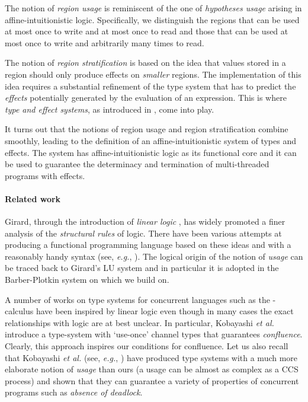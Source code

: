 \documentclass[11pt]{article}
\begin{document}
The notion of {\em region usage} is reminiscent 
of the one of {\em hypotheses usage} arising in affine-intuitionistic logic.
Specifically, we  distinguish the regions that can be used at most
once to write and at most once to read and those that can be used at
most once to write and arbitrarily many times to read. 

The notion of {\em region stratification} is based
on the idea that values stored in a region should only produce effects
on {\em smaller} regions.  The implementation of this idea requires a
substantial refinement of the type system that has to predict the {\em
effects} potentially generated by the evaluation of an expression.  This is 
where  {\em type and effect systems}, as introduced in
\cite{LG88}, come into play.

It turns out that the notions of region usage and region
stratification combine smoothly, leading to the definition of an
affine-intuitionistic system of types and effects. The system has
affine-intuitionistic logic as its functional core and it can be used
to guarantee the determinacy and termination of multi-threaded
programs with effects.


\paragraph{Related work}
Girard, through the introduction of {\em linear logic} \cite{Girard87}, 
has widely promoted a finer analysis of the {\em structural rules} of logic.
There have been various attempts at producing a functional programming
language based on these ideas and with a reasonably handy
syntax (see, {\em e.g.}, 
\cite{BBPH93,Benton94,Plotkin93,MOTW95,Barber96}).  The logical origin
of the notion of {\em usage} can be traced back to Girard's LU system
\cite{Girard91} and in particular it is adopted in the Barber-Plotkin system \cite{Barber96}
on which we build on.

A number of works on type systems for concurrent languages such as the
-calculus have been inspired by linear logic even though in many cases the
exact relationships with logic are at best unclear.  In particular,
Kobayashi {\em et al.} \cite{KPT99} introduce a type-system with
`use-once' channel types that guarantees {\em confluence}.  Clearly,
this approach inspires our conditions for confluence.
Let us also recall that Kobayashi
{\em et al.} (see, {\em e.g.}, \cite{K02,IK05}) have produced type
systems with a much more elaborate notion of {\em usage} than ours (a usage can
be almost as complex as a CCS process) and shown that they can 
guarantee a variety of properties of concurrent programs such as {\em absence of
deadlock}.
\end{document}
